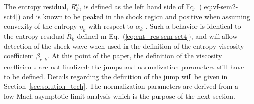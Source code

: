 \documentclass[preprint,10pt]{elsarticle}
\newcommand{\resi}{R}
\newcommand{\resinew}{\widetilde{\resi}}
\newcommand{\eqt}[1]{Eq.~(\ref{#1})}                     %
\newcommand{\sct}[1]{Section~\ref{#1}}                   %
\begin{document}
% 
The entropy residual, $R_{k}^\alpha$, is defined as the left hand side of \eqt{eq:vf-sem2-sct4} and is known to be peaked in the shock region and positive when assuming convexity of the entropy $\eta_k$ with respect to $\alpha_k$ \cite{Leveque}. Such a behavior is identical to the entropy residual $\resinew_k$ defined in \eqt{eq:ent_res-sem-sct4}, and will allow detection of the shock wave when used in the definition of the entropy viscosity coefficient $\beta_{e,k}$.
%
At this point of the paper, the definition of the viscosity coefficients are not finalized: the jumps and normalization parameters still have to be defined. Details regarding the definition of the jump will be given in \sct{sec:solution_tech}. The normalization parameters are derived from a low-Mach asymptotic limit analysis which is the purpose of the next section.
\end{document}
